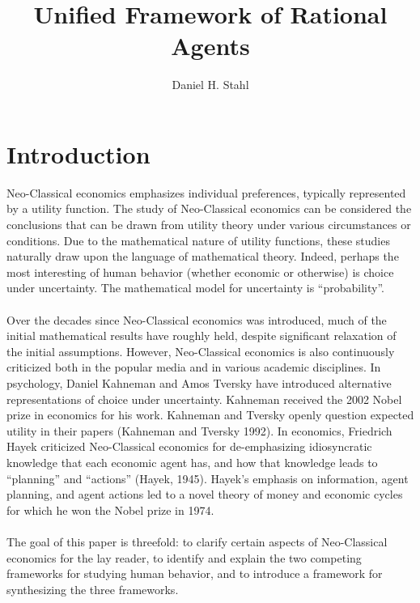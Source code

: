 \documentclass{article}
\begin{document}
	
	
\title{Unified Framework of Rational Agents}
\date{}
\author{Daniel H. Stahl}

\section{Introduction}

Neo-Classical economics emphasizes individual preferences, typically represented by a utility function.  The study of Neo-Classical economics can be considered the conclusions that can be drawn from utility theory under various circumstances or conditions.  Due to the mathematical nature of utility functions, these studies naturally draw upon the language of mathematical theory.  Indeed, perhaps the most interesting of human behavior (whether economic or otherwise) is choice under uncertainty.  The mathematical model for uncertainty is ``probability''.  
\\
\\
Over the decades since Neo-Classical economics was introduced, much of the initial mathematical results have roughly held, despite significant relaxation of the initial assumptions.  However, Neo-Classical economics is also continuously criticized both in the popular media and in various academic disciplines.  In psychology, Daniel Kahneman and Amos Tversky have introduced alternative representations of choice under uncertainty.  Kahneman received the 2002 Nobel prize in economics for his work.  Kahneman and Tversky openly question expected utility in their papers (Kahneman and Tversky 1992).  In economics, Friedrich Hayek criticized Neo-Classical economics for de-emphasizing idiosyncratic knowledge that each economic agent has, and how that knowledge leads to ``planning'' and ``actions'' (Hayek, 1945).  Hayek's emphasis on information, agent planning, and agent actions led to a novel theory of money and economic cycles for which he won the Nobel prize in 1974.  
\\
\\
The goal of this paper is threefold: to clarify certain aspects of Neo-Classical economics for the lay reader, to identify and explain the two competing frameworks for studying human behavior, and to introduce a framework for synthesizing the three frameworks.  
\end{document}
